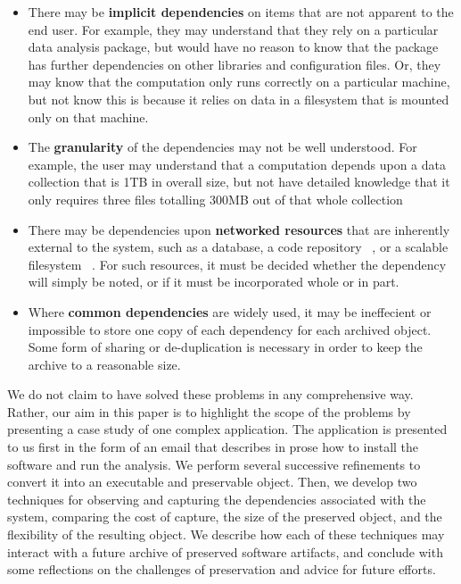 \documentclass{sig-alternate}
\begin{document}
\begin{itemize}
\item There may be {\bf implicit dependencies} on items that are
not apparent to the end user.  For example, they may understand that
they rely on a particular data analysis package, but would have
no reason to know that the package has further dependencies on
other libraries and configuration files.  Or, they may know that
the computation only runs correctly on a particular machine, but
not know this is because it relies on data in a filesystem that
is mounted only on that machine.

\item The {\bf granularity} of the dependencies may not be well understood.
For example, the user may understand that a computation depends upon
a data collection that is 1TB in overall size, but not have detailed
knowledge that it only requires three files totalling 300MB out of that
whole collection

\item There may be dependencies upon {\bf networked resources} that
are inherently external to the system, such as a database, a code
repository ~\cite{cms2006cmssw}, or a scalable filesystem ~\cite{blomer2011cernvm}.  For such resources, it
must be decided whether the dependency will simply be noted, or if it
must be incorporated whole or in part.

\item Where {\bf common dependencies} are widely used, it may be ineffecient or
impossible to store one copy of each dependency for each archived object.
Some form of sharing or de-duplication is necessary in order to keep
the archive to a reasonable size.
\end{itemize}

We do not claim to have solved these problems in any comprehensive
way.  Rather, our aim in this paper is to highlight the scope
of the problems by presenting a case study of one complex application.
The application is presented to us
first in the form of an email that describes in prose how to install
the software and run the analysis.  We perform several successive
refinements to convert it into an executable and preservable object.
Then, we develop two techniques for observing and capturing the
dependencies associated with the system, comparing the cost of capture,
the size of the preserved object, and the flexibility of the resulting
object.  We describe how each of these techniques may interact with
a future archive of preserved software artifacts, and conclude with
some reflections on the challenges of preservation and advice for future efforts.
\end{document}
